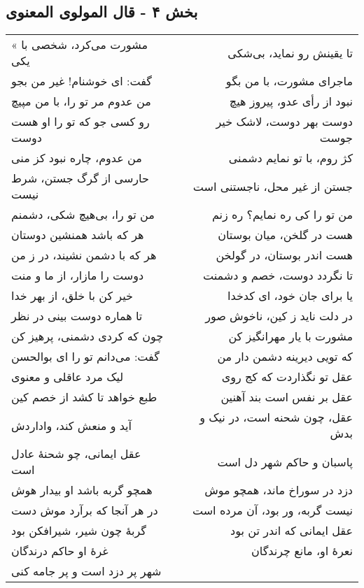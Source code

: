 \begin{center}
\section*{بخش ۴ - قال المولوی المعنوی}
\label{sec:004}
\begin{longtable}{l p{0.5cm} r}
« مشورت می‌کرد، شخصی با یکی
&&
تا یقینش رو نماید، بی‌شکی
\\
گفت: ای خوشنام! غیر من بجو
&&
ماجرای مشورت، با من بگو
\\
من عدوم مر تو را، با من مپیچ
&&
نبود از رأی عدو، پیروز هیچ
\\
رو کسی جو که تو را او هست دوست
&&
دوست بهر دوست، لاشک خیر جوست
\\
من عدوم، چاره نبود کز منی
&&
کژ روم، با تو نمایم دشمنی
\\
حارسی از گرگ جستن، شرط نیست
&&
جستن از غیر محل، ناجستنی است
\\
من تو را، بی‌هیچ شکی، دشمنم
&&
من تو را کی ره نمایم؟ ره زنم
\\
هر که باشد همنشین دوستان
&&
هست در گلخن، میان بوستان
\\
هر که با دشمن نشیند، در ز من
&&
هست اندر بوستان، در گولخن
\\
دوست را مازار، از ما و منت
&&
تا نگردد دوست، خصم و دشمنت
\\
خیر کن با خلق، از بهر خدا
&&
یا برای جان خود، ای کدخدا
\\
تا هماره دوست بینی در نظر
&&
در دلت ناید ز کین، ناخوش صور
\\
چون که کردی دشمنی، پرهیز کن
&&
مشورت با یار مهرانگیز کن
\\
گفت: می‌دانم تو را ای بوالحسن
&&
که تویی دیرینه دشمن دار من
\\
لیک مرد عاقلی و معنوی
&&
عقل تو نگذاردت که کج روی
\\
طبع خواهد تا کشد از خصم کین
&&
عقل بر نفس است بند آهنین
\\
آید و منعش کند، واداردش
&&
عقل، چون شحنه است، در نیک و بدش
\\
عقل ایمانی، چو شحنهٔ عادل است
&&
پاسبان و حاکم شهر دل است
\\
همچو گربه باشد او بیدار هوش
&&
دزد در سوراخ ماند، همچو موش
\\
در هر آنجا که برآرد موش دست
&&
نیست گربه، ور بود، آن مرده است
\\
گربهٔ چون شیر، شیرافکن بود
&&
عقل ایمانی که اندر تن بود
\\
غرهٔ او حاکم درندگان
&&
نعرهٔ او، مانع چرندگان
\\
شهر پر دزد است و پر جامه کنی

\end{longtable}
\end{center}
